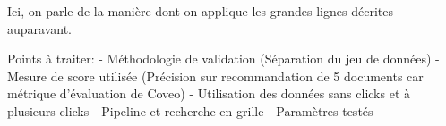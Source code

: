 Ici, on parle de la manière dont on applique les grandes lignes décrites auparavant.

Points à traiter:
	- Méthodologie de validation (Séparation du jeu de données)
	- Mesure de score utilisée (Précision sur recommandation de 5 documents car métrique d'évaluation de Coveo)
	- Utilisation des données sans clicks et à plusieurs clicks
	- Pipeline et recherche en grille
	- Paramètres testés
	